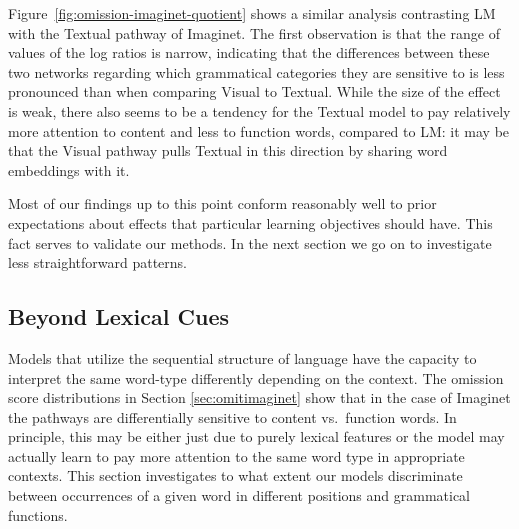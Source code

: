 Figure~\ref{fig:omission-imaginet-quotient} shows a similar analysis
contrasting {\sc LM} with the {\sc Textual} pathway of {\sc
  Imaginet}. The first observation is that the range of values of the
log ratios is narrow, indicating that the differences between these
two networks regarding which grammatical categories they are sensitive
to is less pronounced than when comparing {\sc Visual} to {\sc
  Textual}. While the size of the effect is weak, there also seems to
be a tendency for the {\sc Textual} model to pay relatively more
attention to content and less to function words, compared to
{\sc LM}: it may be that the {\sc Visual} pathway pulls {\sc Textual}
in this direction by sharing word embeddings with it.


Most of our findings up to this point conform reasonably well to prior
expectations about effects that  particular learning objectives should
have. This fact serves to validate our methods. In the next section we
go on to investigate less straightforward patterns.



\subsection{Beyond Lexical Cues}
\label{sec:beyondlexical}

Models that utilize the sequential structure of language 
have the capacity to interpret the same word-type differently depending on
the context. The omission score distributions in Section \ref{sec:omitimaginet} 
show that in the case of {\sc Imaginet} the 
pathways are differentially sensitive to content vs.\ function
words. In principle, this may be either just due to purely lexical features or the model 
may actually learn to pay more attention to the same word type in appropriate
contexts. This section investigates to what extent our models
discriminate between occurrences of a given word in different positions and 
grammatical functions. 



